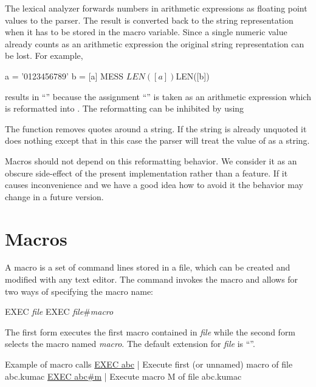 The lexical analyzer forwards numbers in arithmetic expressions as
floating point values to the parser.
The result is converted back to the string representation when
it has to be stored in the macro variable.
Since a single numeric value already counts as an arithmetic
expression the original string representation can be lost.
For example,
\begin{XMP}
a = '0123456789'
b = [a]
MESS $LEN([a]) $LEN([b])
\end{XMP}
results in ``'' because the assignment 
``'' is taken as an arithmetic expression which
is reformatted into .
The reformatting can be inhibited by using
The  function removes quotes around a string.
If the string is already unquoted it does nothing except that in this
case the parser will treat the value of \Lit{[a]} as a string.

Macros should not depend on this reformatting behavior.
We consider it as an obscure side-effect of the present implementation
rather than a feature.
If it causes inconvenience and we have a good idea how to avoid it the
behavior may change in a future \KUIP{} version.

\normalsize

\section{Macros}

A macro is a set of command lines stored in a file,
which can be created and modified with any text editor.
The command  invokes the macro and allows for two ways of
specifying the macro name:
\begin{XMP}
EXEC \textsl{file}
EXEC \textsl{file}\#\textsl{macro}
\end{XMP}
The first form executes the first macro contained in \textsl{file}
while the second form selects the macro named \textsl{macro}.
The default extension for \textsl{file} is ``''.

\begin{XMPt}{Example of macro calls}
\PROMPT{} \underline{EXEC abc}   | Execute first (or unnamed) macro of file abc.kumac
\PROMPT{} \underline{EXEC abc#m} | Execute macro M of file abc.kumac
\end{XMPt}

